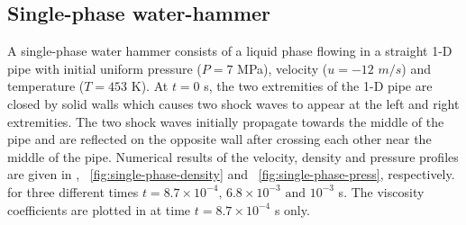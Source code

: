 \documentclass{mc2015}
\begin{document}
\subsection{Single-phase water-hammer} \label{sec:single-num-res}
%
A single-phase water hammer consists of a liquid phase flowing in a straight 1-D pipe with initial uniform pressure ($P = 7$ MPa), velocity ($u = -12$ $m/s$) and temperature ($T = 453$ K). At $t=0$ s, the two extremities of the 1-D pipe are closed by solid walls which causes two shock waves to appear at the left and right extremities. The two shock waves initially propagate towards the middle of the pipe and are reflected on the opposite wall after crossing each other near the middle of the pipe. Numerical results of the velocity, density and pressure profiles are given in , ~\ref{fig:single-phase-density} and ~\ref{fig:single-phase-press}, respectively.\, for three different times $t=8.7 \times 10^{-4}, \, 6.8 \times 10^{-3} \text{ and } 10^{-3}$ s. The viscosity coefficients are plotted in  at time $t = 8.7 \times 10^{-4}$ s only.
%
\end{document}
